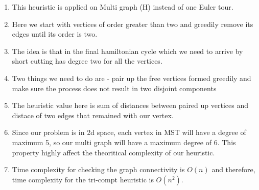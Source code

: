 \begin{enumerate}
    \item This heuristic is applied on Multi graph (H) instead of one Euler tour.
    \item Here we start with vertices of order greater than two and greedily remove its edges until its order is two.
    \item The idea is that in the final hamiltonian cycle which we need to arrive by short cutting has degree two for all the vertices.
    \item Two things we need to do are - pair up the free vertices formed greedily and make sure the process does not result in two disjoint components
    \item The heuristic value here is sum of distances between paired up vertices and distace of two edges that remained with our vertex.
    \item Since our problem is in 2d space, each vertex in MST will have a degree of maximum 5, so our multi graph will have a maximum degree of 6. This property highly affect the theoritical complexity of our heuristic.
    \item Time complexity for checking the graph connectivity is $O(n)$ and therefore, time complexity for the tri-compt heuristic is $O(n^2)$.
\end{enumerate}


